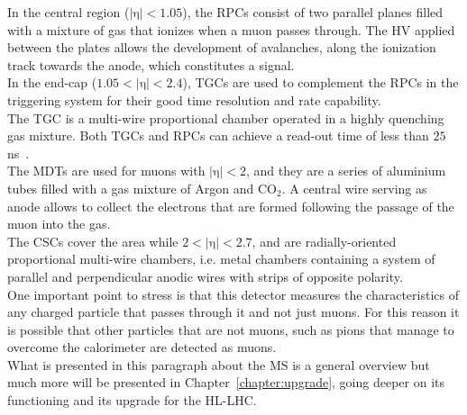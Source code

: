 \vspace{\baselineskip}
In the central region ($\mathrm {|\eta | <1.05}$), the RPCs consist of two parallel planes filled with a mixture of gas that ionizes when a muon passes through.
The HV applied between the plates allows the development of avalanches, along the ionization track towards the anode, which constitutes a signal.\\
In the end-cap ($\mathrm {1.05<|\eta |<2.4}$), TGCs are used to complement the RPCs in the triggering system for their good time resolution and rate capability. 
\\The TGC is a multi-wire proportional chamber operated in a highly quenching gas mixture.
Both TGCs and RPCs can achieve a read-out time of less than $\mathrm {25}$ ns~\cite{MS}.
\vspace{\baselineskip}
\\The MDTs are used for muons with $\mathrm {|\eta | <2}$, and they are a series of aluminium tubes filled with a gas mixture of Argon and $\mathrm {CO_2}$.
A central wire serving as anode allows to collect the electrons that are formed following the passage of the muon into the gas.
\\The CSCs cover the area while $ \mathrm {2 <| \eta | <2.7}$, and are radially-oriented proportional multi-wire chambers, i.e. metal chambers containing a system of parallel and perpendicular 
anodic wires with strips of opposite polarity.
\vspace{\baselineskip}
\\One important point to stress is that this detector measures the characteristics of any charged particle that passes through it and not just muons.
For this reason it is possible that other particles that are not muons, such as pions that manage to overcome the calorimeter are detected as muons.\\
What is presented in this paragraph about the MS is a general overview but much more will be presented in Chapter~\ref{chapter:upgrade}, going deeper on its functioning
and its upgrade for the HL-LHC.

\FloatBarrier
